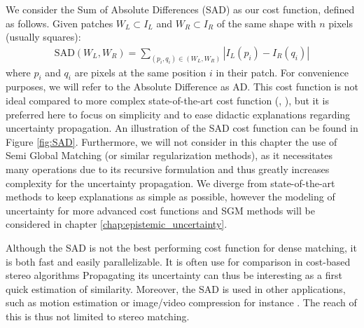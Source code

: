 We consider the Sum of Absolute Differences (SAD) as our cost function, defined as follows. Given patches $W_L\subset I_L$ and $W_R\subset I_R$ of the same shape with $n$ pixels (usually squares):
\begin{align}
    \mathrm{SAD}(W_L, W_R) = \sum_{(p_i, q_i)\in (W_L, W_R)}|I_L(p_i) - I_R(q_i)|\label{eq:SAD}
\end{align}
where $p_i$ and $q_i$ are pixels at the same position $i$ in their patch. For convenience purposes, we will refer to the Absolute Difference as AD. This cost function is not ideal compared to more complex state-of-the-art cost function (\cite{zbontar_stereo_2016}, \cite{laga_survey_2022}), but it is preferred here to focus on simplicity and to ease didactic explanations regarding uncertainty propagation. An illustration of the SAD cost function can be found in Figure \ref{fig:SAD}. Furthermore, we will not consider in this chapter the use of Semi Global Matching (or similar regularization methods), as it necessitates many operations due to its recursive formulation and thus greatly increases complexity for the uncertainty propagation. We diverge from state-of-the-art methods to keep explanations as simple as possible, however the modeling of uncertainty for more advanced cost functions and SGM methods will be considered in chapter \ref{chap:epistemic_uncertainty}.

\begin{remark}
    Although the SAD is not the best performing cost function for dense matching, it is both fast and easily parallelizable. It is often use for comparison in cost-based stereo algorithms \cite{hirschmuller_evaluation_2007, zbontar_stereo_2016} Propagating its uncertainty can thus be interesting as a first quick estimation of similarity. Moreover, the SAD is used in other applications, such as motion estimation or image/video compression for instance \cite{richardson_h264_2006}. The reach of this is thus not limited to stereo matching. 
\end{remark}

